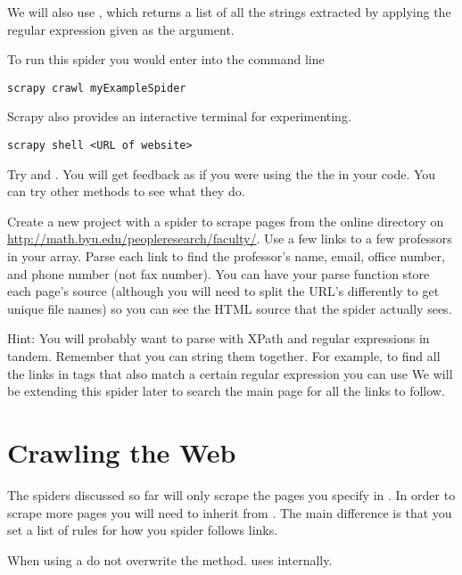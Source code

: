 We will also use , which returns a list of all the strings extracted by applying the regular expression given as the argument.

To run this spider you would enter into the command line
\begin{lstlisting}
scrapy crawl myExampleSpider
\end{lstlisting}

Scrapy also provides an interactive terminal for experimenting.
\begin{lstlisting}
scrapy shell <URL of website>
\end{lstlisting}

Try  and . You will get feedback as if you were using the the  in your code. You can try other methods to see what they do.

\begin{problem}
Create a new project with a spider to scrape pages from the online directory on \url{http://math.byu.edu/peopleresearch/faculty/}.
Use a few links to a few professors in your  array.
Parse each link to find the professor's name, email, office number, and phone number (not fax number).
You can have your parse function store each page's source (although you will need to split the URL's differently to get unique file names) so you can see the HTML source that the spider actually sees.

Hint: You will probably want to parse with XPath and regular expressions in tandem. Remember that you can string them together.
For example, to find all the  links in  tags that also match a certain regular expression you can use 
We will be extending this spider later to search the main page for all the links to follow.
\end{problem}

\section*{Crawling the Web}
The spiders discussed so far will only scrape the pages you specify in .
In order to scrape more pages you will need to inherit from .
The main difference is that you set a list of rules for how you spider follows links.

\begin{warn}
When using a  do not overwrite the  method. 
 uses  internally.
\end{warn}

